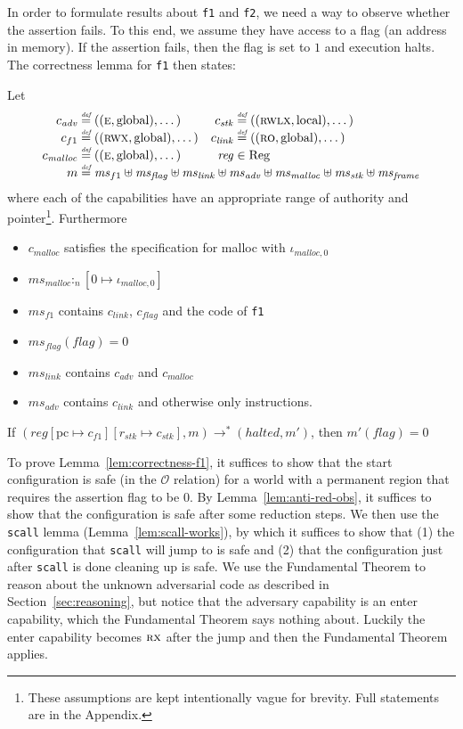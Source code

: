 \documentclass[format=acmsmall, review=true, screen=true]{acmart}
\renewcommand{\sectionname}{Section}
\newcommand{\update}[2]{[#1 \mapsto #2]}
\newcommand{\defeq}{\stackrel{\textit{\tiny{def}}}{=}}
\newcommand{\var}[1]{\mathit{#1}}
\newcommand{\hs}{\var{ms}}
\newcommand{\ms}{\hs}
\newcommand{\pcreg}{\mathrm{pc}}
\newcommand{\reg}{\var{reg}}
\newcommand{\heap}{\var{mem}}
\newcommand{\adv}{\var{adv}}
\newcommand{\link}{\var{link}}
\newcommand{\stk}{\var{stk}}
\newcommand{\flag}{\var{flag}}
\newcommand{\halted}{\mathit{halted}}
\newcommand{\heapSat}[3][\heap]{#1 :_{#2} #3}
\newcommand{\codelabel}[1]{\mathit{#1}}
\newcommand{\malloc}{\codelabel{malloc}}
\newcommand{\plaindom}[1]{\mathrm{#1}}
\newcommand{\Regs}{\plaindom{Reg}}
\newcommand{\observations}{\mathcal{O}}
\newcommand{\plainperm}[1]{\textsc{#1}}
\newcommand{\readonly}{\plainperm{ro}}
\newcommand{\exec}{\plainperm{rx}}
\newcommand{\entry}{\plainperm{e}}
\newcommand{\rwx}{\plainperm{rwx}}
\newcommand{\rwlx}{\plainperm{rwlx}}
\newcommand{\plainlocality}[1]{\mathrm{#1}}
\newcommand{\local}{\plainlocality{local}}
\newcommand{\glob}{\plainlocality{global}}
\newcommand{\step}[1][]{\rightarrow_{#1}}
\begin{document}
In order to formulate results about \texttt{f1} and
\texttt{f2}, we need a way to observe whether the assertion
fails. To this end, we assume they have access to a flag (an address in memory).
If the assertion fails, then the flag is set to $1$ and execution halts. The correctness lemma
for \texttt{f1} then states:
\begin{lemma}
  \label{lem:correctness-f1}
  Let
\[
    \begin{array}{r@{}lr@{}l}
    c_\adv & \;\defeq ((\entry,\glob),\dots) & c_{\var{stk}} & \;\defeq ((\rwlx,\local),\dots)\\
    c_{f1} & \;\defeq ((\rwx,\glob),\dots) & c_\link &\; \defeq ((\readonly,\glob),\dots)\\
    c_\malloc &\; \defeq ((\entry,\glob),\dots) & \reg& \; \in \Regs \\
    m &  \multicolumn{3}{@{}l}{\;\defeq \ms_{f1} \uplus \ms_\flag \uplus \ms_{\var{link}} \uplus \hs_\adv \uplus \ms_{\malloc} \uplus \ms_{\var{stk}} \uplus \ms_{\var{frame}}} \\
    \end{array}
\]
where each of the capabilities have an appropriate range of authority and
pointer\footnote{These assumptions are kept intentionally vague for brevity.
  Full statements are in the Appendix.}.
Furthermore
  \begin{itemize}
  \item $c_\malloc$ satisfies the specification for malloc with
    $\iota_{\malloc,0}$
  \item $\heapSat[\hs_{\malloc}]{n}{[0 \mapsto \iota_{\malloc,0}]}$
  \item $\ms_{f1}$ contains $c_\link$, $c_\flag$ and the code of \texttt{f1}
  \item $\ms_\flag(\flag) = 0$
  \item $\ms_{\var{link}}$ contains $c_\adv$ and $c_\malloc$
  \item $\hs_\adv$ contains $c_\link$ and otherwise only instructions.
  \end{itemize}
  If $(\reg\update{\pcreg}{c_{f1}}\update{r_\stk}{c_\stk},m) \step^* (\halted,m')$,
  then $m'(\flag) = 0$
\end{lemma}

To prove Lemma~\ref{lem:correctness-f1}, it suffices to show that the start
configuration is safe (in the $\observations$ relation) for a world with a
permanent region that requires the assertion flag to be 0. By
Lemma~\ref{lem:anti-red-obs}, it suffices to show that the configuration is safe
after some reduction steps. We then use the \texttt{scall} lemma
(Lemma~\ref{lem:scall-works}), by which it suffices to show that (1) the
configuration that \texttt{scall} will jump to is safe and (2)
that the configuration just after \texttt{scall} is done cleaning
up is safe. We use the Fundamental Theorem to reason about the unknown
adversarial code as described in \sectionname~\ref{sec:reasoning}, but notice
that the adversary capability is an enter capability, which the Fundamental
Theorem says nothing about. Luckily the enter capability becomes $\exec$ after
the jump and then the Fundamental Theorem applies.
\end{document}
